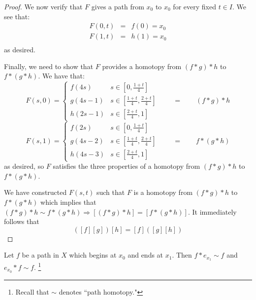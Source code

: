 \begin{proof}
We now verify that $F$ gives a path from $x_0$ to $x_0$ for every fixed $t\in I$. We see that:
\begin{eqnarray*} 
 F(0,t) & = & f(0) = x_0\\
 F(1,t) & = & h(1) = x_0\\
\end{eqnarray*}
as desired.

Finally, we need to show that $F$ provides a homotopy from $(f*g)*h$ to $f*(g*h)$. We have that:
\[F(s,0) = \begin{cases}f\left(4s \right)& s \in \left[ 0,\frac{1+t}4 \right] \\
g(4s-1) & s\in \left[\frac{1+t}4, \frac{2+t}4\right]  \\ 
h\left(2s - 1 \right) & s\in \left[\frac{2+t}4,1\right]\end{cases}\qquad = \qquad (f*g)*h \]
\[F(s,1) = \begin{cases}f\left(2s  \right)& s \in \left[ 0,\frac{1+t}4 \right] \\
g(4s-2) & s\in \left[\frac{1+t}4, \frac{2+t}4\right]  \\ 
h\left(4s - 3 \right) & s\in \left[\frac{2+t}4,1\right]\end{cases}\qquad = \qquad f* (g*h)\]
as desired, so $F$ satisfies the three properties of a homotopy from $(f*g)*h$ to $f*(g*h)$.

We have constructed $F(s,t)$ such that $F$ is a homotopy from $(f*g)*h$ to $f*(g*h)$ which implies that $(f*g)*h \sim f*(g*h) \Rightarrow [(f*g)*h] = [f*(g*h)]$. It immediately follows that
\[ ([f][g])[h] = [f]([g][h])\]
\end{proof}


\begin{lemma}[Identity]
 Let $f$ be a path in $X$ which begins at $x_0$ and ends at $x_1$.  Then $f*e_{x_1}\sim f$ and $e_{x_0}* f \sim f$. \footnote{Recall that $\sim$ denotes ``path homotopy."}
 \end{lemma}


